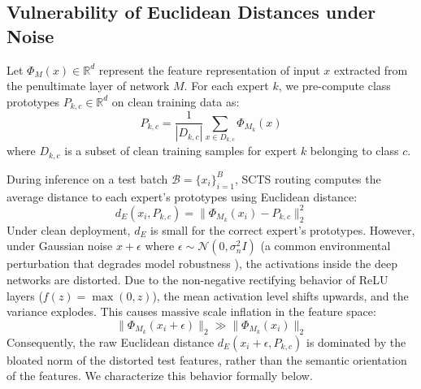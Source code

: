 \documentclass{article}
\theoremstyle{plain}
\theoremstyle{definition}
\theoremstyle{remark}
\begin{document}
\subsection{Vulnerability of Euclidean Distances under Noise}
Let $\Phi_{M}(x) \in \mathbb{R}^d$ represent the feature representation of input $x$ extracted from the penultimate layer of network $M$. For each expert $k$, we pre-compute class prototypes $P_{k,c} \in \mathbb{R}^d$ on clean training data as:
\begin{equation}
P_{k,c} = \frac{1}{|D_{k,c}|} \sum_{x \in D_{k,c}} \Phi_{M_k}(x)
\end{equation}
where $D_{k,c}$ is a subset of clean training samples for expert $k$ belonging to class $c$.

During inference on a test batch $\mathcal{B} = \{x_i\}_{i=1}^B$, SCTS routing computes the average distance to each expert's prototypes using Euclidean distance:
\begin{equation}
d_{E}(x_i, P_{k,c}) = \|\Phi_{M_k}(x_i) - P_{k,c}\|_2^2
\end{equation}
Under clean deployment, $d_{E}$ is small for the correct expert's prototypes. However, under Gaussian noise $x + \epsilon$ where $\epsilon \sim \mathcal{N}(0, \sigma_n^2 I)$ (a common environmental perturbation that degrades model robustness \cite{hendrycks19robustness}), the activations inside the deep networks are distorted. Due to the non-negative rectifying behavior of ReLU layers ($f(z) = \max(0, z)$), the mean activation level shifts upwards, and the variance explodes. This causes massive scale inflation in the feature space:
\begin{equation}
\|\Phi_{M_k}(x_i + \epsilon)\|_2 \gg \|\Phi_{M_k}(x_i)\|_2
\end{equation}
Consequently, the raw Euclidean distance $d_{E}(x_i + \epsilon, P_{k,c})$ is dominated by the bloated norm of the distorted test features, rather than the semantic orientation of the features. We characterize this behavior formally below.
\end{document}
